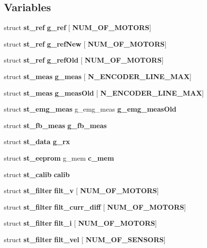 \subsection*{Variables}
\begin{DoxyCompactItemize}
\item 
\mbox{\label{globals_8h_a975e5cde4f157d8bbdbde3c03227f3de}} 
struct \textbf{ st\+\_\+ref} {\bfseries g\+\_\+ref} [\textbf{ N\+U\+M\+\_\+\+O\+F\+\_\+\+M\+O\+T\+O\+RS}]
\item 
\mbox{\label{globals_8h_ab40c607c340b011a96046994f4b2229c}} 
struct \textbf{ st\+\_\+ref} {\bfseries g\+\_\+ref\+New} [\textbf{ N\+U\+M\+\_\+\+O\+F\+\_\+\+M\+O\+T\+O\+RS}]
\item 
struct \textbf{ st\+\_\+ref} \textbf{ g\+\_\+ref\+Old} [\textbf{ N\+U\+M\+\_\+\+O\+F\+\_\+\+M\+O\+T\+O\+RS}]
\item 
\mbox{\label{globals_8h_a6f0c00c1300c30d398231d1e76f3f780}} 
struct \textbf{ st\+\_\+meas} {\bfseries g\+\_\+meas} [\textbf{ N\+\_\+\+E\+N\+C\+O\+D\+E\+R\+\_\+\+L\+I\+N\+E\+\_\+\+M\+AX}]
\item 
struct \textbf{ st\+\_\+meas} \textbf{ g\+\_\+meas\+Old} [\textbf{ N\+\_\+\+E\+N\+C\+O\+D\+E\+R\+\_\+\+L\+I\+N\+E\+\_\+\+M\+AX}]
\item 
struct \textbf{ st\+\_\+emg\+\_\+meas} g\+\_\+emg\+\_\+meas \textbf{ g\+\_\+emg\+\_\+meas\+Old}
\item 
struct \textbf{ st\+\_\+fb\+\_\+meas} \textbf{ g\+\_\+fb\+\_\+meas}
\item 
struct \textbf{ st\+\_\+data} \textbf{ g\+\_\+rx}
\item 
struct \textbf{ st\+\_\+eeprom} g\+\_\+mem \textbf{ c\+\_\+mem}
\item 
struct \textbf{ st\+\_\+calib} \textbf{ calib}
\item 
\mbox{\label{globals_8h_a0e9a576515332f8bd83ae6a2fe0164aa}} 
struct \textbf{ st\+\_\+filter} {\bfseries filt\+\_\+v} [\textbf{ N\+U\+M\+\_\+\+O\+F\+\_\+\+M\+O\+T\+O\+RS}]
\item 
\mbox{\label{globals_8h_a503852d956ef1e03f4a9d8b91db248fc}} 
struct \textbf{ st\+\_\+filter} {\bfseries filt\+\_\+curr\+\_\+diff} [\textbf{ N\+U\+M\+\_\+\+O\+F\+\_\+\+M\+O\+T\+O\+RS}]
\item 
struct \textbf{ st\+\_\+filter} \textbf{ filt\+\_\+i} [\textbf{ N\+U\+M\+\_\+\+O\+F\+\_\+\+M\+O\+T\+O\+RS}]
\item 
struct \textbf{ st\+\_\+filter} \textbf{ filt\+\_\+vel} [\textbf{ N\+U\+M\+\_\+\+O\+F\+\_\+\+S\+E\+N\+S\+O\+RS}]
\item 

\end{DoxyCompactItemize}
